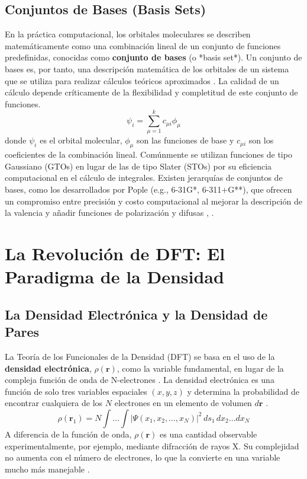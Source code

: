 \subsection{Conjuntos de Bases (Basis Sets)}
En la práctica computacional, los orbitales moleculares se describen matemáticamente como una combinación lineal de un conjunto de funciones predefinidas, conocidas como \textbf{conjunto de bases} (o *basis set*). Un conjunto de bases es, por tanto, una descripción matemática de los orbitales de un sistema que se utiliza para realizar cálculos teóricos aproximados \cite[131]{ramachandran2008computational}. La calidad de un cálculo depende críticamente de la flexibilidad y completitud de este conjunto de funciones.
$$ \psi_i = \sum_{\mu=1}^{k} c_{\mu i} \phi_{\mu} $$
donde $\psi_i$ es el orbital molecular, $\phi_{\mu}$ son las funciones de base y $c_{\mu i}$ son los coeficientes de la combinación lineal. Comúnmente se utilizan funciones de tipo Gaussiano (GTOs) en lugar de las de tipo Slater (STOs) por su eficiencia computacional en el cálculo de integrales. Existen jerarquías de conjuntos de bases, como los desarrollados por Pople (e.g., 6-31G*, 6-311+G**), que ofrecen un compromiso entre precisión y costo computacional al mejorar la descripción de la valencia y añadir funciones de polarización y difusas \cite[195]{szabo1996modern}, \cite[140]{ramachandran2008computational}.

\section{La Revolución de DFT: El Paradigma de la Densidad}

\subsection{La Densidad Electrónica y la Densidad de Pares}
La Teoría de los Funcionales de la Densidad (DFT) se basa en el uso de la \textbf{densidad electrónica}, $\rho(\mathbf{r})$, como la variable fundamental, en lugar de la compleja función de onda de N-electrones \cite[187]{ramachandran2008computational}. La densidad electrónica es una función de solo tres variables espaciales $(x, y, z)$ y determina la probabilidad de encontrar cualquiera de los $N$ electrones en un elemento de volumen $d\mathbf{r}$ \cite[36]{koch2015chemist}.
$$ \rho(\mathbf{r}_1) = N \int \dots \int |\Psi(x_1, x_2, \dots, x_N)|^2 \, ds_1 \, dx_2 \dots dx_N $$
A diferencia de la función de onda, $\rho(\mathbf{r})$ es una cantidad observable experimentalmente, por ejemplo, mediante difracción de rayos X. Su complejidad no aumenta con el número de electrones, lo que la convierte en una variable mucho más manejable \cite[p. 253]{jensen2017introduction}.


